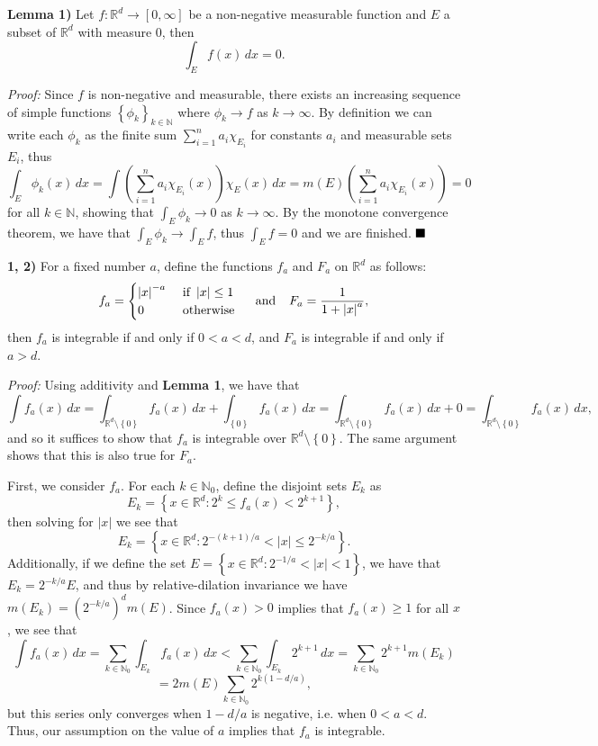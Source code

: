 \documentclass[12pt]{article}
\newcommand{\N}{\ensuremath{\mathbb{N}}}
\newcommand{\R}{\ensuremath{\mathbb{R}}}
\newcommand{\braceb}[1]{\left\{#1\right\}}
\newcommand{\parenb}[1]{\left(#1\right)}
\newcommand{\vertb}[1]{\left\vert#1\right\vert}
\newcommand{\sdiff}{\setminus}
\newcommand{\proof}{\textit{Proof: }}
\newcommand{\done}{\ensuremath{\strut\hfill\blacksquare}}
\renewcommand{\t}[1]{\text{ #1 }}
\newcommand{\sectionskip}{\vspace{0.15in}}
\begin{document}
\pagestyle{fancy}

\setlength{\parindent}{0in}
\setlength{\parskip}{0.1in}

\textbf{Lemma 1)}
Let \( f : \R^d \to [0, \infty] \) be a non-negative measurable function and
\( E \) a subset of \( \R^d \) with measure 0, then
\[
	\int_E f(x) \, dx = 0.
\]

\proof
Since \( f \) is non-negative and measurable, there exists an increasing
sequence of simple functions \( \braceb{\phi_k}_{k \in \N} \) where
\( \phi_k \to f \) as \( k \to \infty \).
By definition we can write each \( \phi_k \) as the finite sum
\( \sum_{i = 1}^n a_i\chi_{E_i} \) for constants \( a_i \) and measurable sets
\( E_i \), thus
\[
	\int_E \phi_k(x) \, dx
	= \int \parenb{\sum_{i = 1}^n a_i\chi_{E_i}(x)} \chi_{E}(x) \, dx
	= m(E) \parenb{\sum_{i = 1}^n a_i\chi_{E_i}(x)}
	= 0
\]
for all \( k \in \N \), showing that \( \int_E \phi_k \to 0 \) as
\( k \to \infty \).
By the monotone convergence theorem, we have that
\( \int_E \phi_k \to \int_E f \), thus \( \int_E f = 0 \) and we are finished.
\done

\sectionskip

\textbf{1, 2)}
For a fixed number \( a \), define the functions \( f_a \) and
\( F_a \) on \( \R^d \) as follows:
\[
	f_a = \begin{cases}
		\vertb{x}^{-a} & \t{if} \vertb{x} \leq 1 \\
		0              & \t{otherwise}
	\end{cases}
	\hspace{0.1in}
	\t{and}
	\hspace{0.1in}
	F_a = \frac{1}{1 + \vertb{x}^a},
\]
then \( f_a \) is integrable if and only if \( 0 < a < d \), and \( F_a \) is
integrable if and only if \( a > d \).

\proof
Using additivity and \textbf{Lemma 1}, we have that
\[
	\int f_a(x) \, dx
	= \int_{\R^d \sdiff \braceb{0}} f_a(x) \, dx
	+ \int_{\braceb{0}} f_a(x) \, dx
	= \int_{\R^d \sdiff \braceb{0}} f_a(x) \, dx + 0
	= \int_{\R^d \sdiff \braceb{0}} f_a(x) \, dx,
\]
and so it suffices to show that \( f_a \) is integrable over
\( \R^d \sdiff \braceb{0} \).
The same argument shows that this is also true for \( F_a \).

First, we consider \( f_a \).
For each \( k \in \N_0 \), define the disjoint sets \( E_k \) as
\[
	E_k = \braceb{x \in \R^d : 2^k \leq f_a(x) < 2^{k + 1}},
\]
then solving for \( \vertb{x} \) we see that
\[
	E_k = \braceb{x \in \R^d : 2^{-(k + 1)/a} < \vertb{x} \leq 2^{-k/a}}.
\]
Additionally, if we define the set
\( E = \braceb{x \in \R^d : 2^{-1/a} < \vertb{x} < 1} \), we have that
\( E_k = 2^{-k/a}E \), and thus by relative-dilation invariance we have
\( m(E_k) = (2^{-k/a})^d m(E) \).
Since \( f_a(x) > 0 \) implies that \( f_a(x) \geq 1 \) for all \( x \), we
see that
\[
	\int f_a(x) \, dx
	= \sum_{k \in \N_0} \int_{E_k} f_a(x) \, dx
	< \sum_{k \in \N_0} \int_{E_k} 2^{k + 1} \, dx
	= \sum_{k \in \N_0} 2^{k + 1}m(E_k)
\]
\[
	= 2m(E) \sum_{k \in \N_0} 2^{k(1 - d/a)},
\]
but this series only converges when \( 1 - d/a \) is negative, i.e. when
\( 0 < a < d \).
Thus, our assumption on the value of \( a \) implies that \( f_a \) is
integrable.
\end{document}
